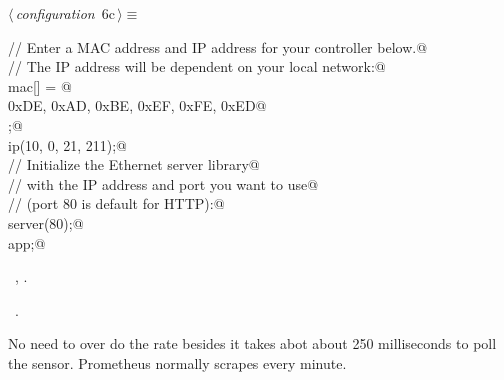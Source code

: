 \documentclass[a4paper, 12pt]{article}
\begin{document}
\begin{flushleft} \small
\begin{minipage}{\linewidth}\label{scrap8}\raggedright\small
{}$\langle\,${\itshape configuration}\nobreak\ {\footnotesize{6c}}$\,\rangle\equiv$
\vspace{-1ex}
\begin{list}{}{\setlength{\leftmargin}{1em}} \item
\mbox{}\lstinline@// Enter a MAC address and IP address for your controller below.@\\
\mbox{}\lstinline@// The IP address will be dependent on your local network:@\\
\mbox{}\lstinline@byte mac[] = {@\\
\mbox{}\lstinline@  0xDE, 0xAD, 0xBE, 0xEF, 0xFE, 0xED@\\
\mbox{}\lstinline@};@\\
\mbox{}\lstinline@IPAddress ip(10, 0, 21, 211);@\\
\mbox{}\lstinline@// Initialize the Ethernet server library@\\
\mbox{}\lstinline@// with the IP address and port you want to use@\\
\mbox{}\lstinline@// (port 80 is default for HTTP):@\\
\mbox{}\lstinline@EthernetServer server(80);@\\
\mbox{}\lstinline@Application app;@\\
\mbox{}{\NWsep}
\end{list}
\vspace{-1ex}
\vspace{-1ex}
\footnotesize
\begin{list}{}{\setlength{\itemsep}{-\parsep}\setlength{\itemindent}{-\leftmargin}}
\item \NWtxtMacroDefBy\ , .
\item \NWtxtMacroRefIn\ .
\end{list}
\end{minipage}
\end{flushleft}

No need to over do the rate besides it takes abot about 250 milliseconds to poll the sensor.
Prometheus normally scrapes every minute.
\end{document}
